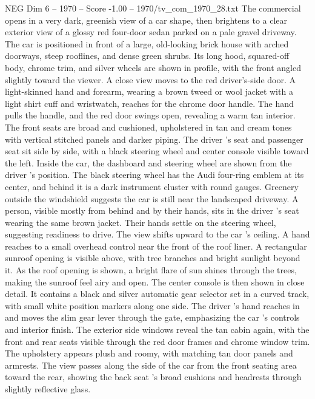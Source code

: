 \begin{textsample}{NEG Dim 6 – 1970 – Score -1.00 – 1970/tv\_com\_1970\_28.txt}  \label{ex:f6_neg_053}
The commercial opens in a very dark, greenish view of a car shape, then brightens to a clear exterior view of a glossy red four-door sedan parked on a pale gravel driveway.
The car is positioned in front of a large, old-looking brick house with arched doorways, steep rooflines, and dense green shrubs.
Its long hood, squared-off body, chrome trim, and silver wheels are shown in profile, with the front angled slightly toward the viewer.
A close view moves to the red driver’s-side door.
A light-skinned hand and forearm, wearing a brown tweed or wool jacket with a light shirt cuff and wristwatch, reaches for the chrome door handle.
The hand pulls the handle, and the red door swings open, revealing a warm tan interior.
The front seats are broad and cushioned, upholstered in tan and cream tones with vertical stitched panels and darker piping.
The driver ’s seat and passenger seat sit side by side, with a black steering wheel and center console visible toward the left.
Inside the car, the dashboard and steering wheel are shown from the driver ’s position.
The black steering wheel has the Audi four-ring emblem at its center, and behind it is a dark instrument cluster with round gauges.
Greenery outside the windshield suggests the car is still near the landscaped driveway.
A person, visible mostly from behind and by their hands, sits in the driver ’s seat wearing the same brown jacket.
Their hands settle on the steering wheel, suggesting readiness to drive.
The view shifts upward to the car ’s ceiling.
A hand reaches to a small overhead control near the front of the roof liner.
A rectangular sunroof opening is visible above, with tree branches and bright sunlight beyond it.
As the roof opening is shown, a bright flare of sun shines through the trees, making the sunroof feel airy and open.
The center console is then shown in close detail.
It contains a black and silver automatic gear selector set in a curved track, with small white position markers along one side.
The driver ’s hand reaches in and moves the slim gear lever through the gate, emphasizing the car ’s controls and interior finish.
The exterior side windows reveal the tan cabin again, with the front and rear seats visible through the red door frames and chrome window trim.
The upholstery appears plush and roomy, with matching tan door panels and armrests.
The view passes along the side of the car from the front seating area toward the rear, showing the back seat ’s broad cushions and headrests through slightly reflective glass.

\end{textsample}

